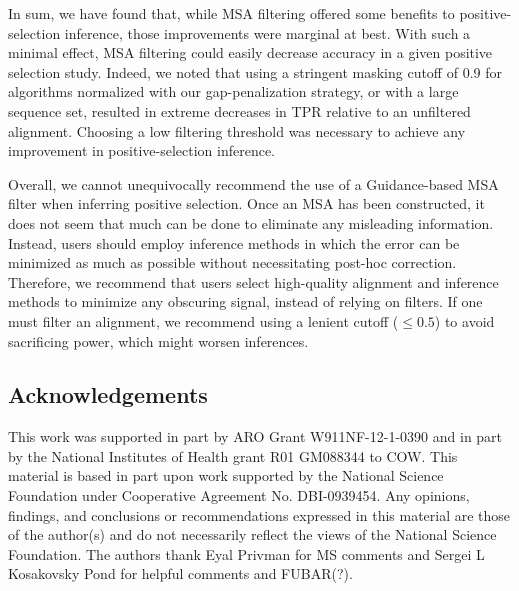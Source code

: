 \documentclass[11pt]{article}
\begin{document}
In sum, we have found that, while MSA filtering offered some benefits to positive-selection inference, those improvements were marginal at best. With such a minimal effect, MSA filtering could easily decrease accuracy in a given positive selection study. Indeed, we noted that using a stringent masking cutoff of 0.9 for algorithms normalized with our gap-penalization strategy, or with a large sequence set, resulted in extreme decreases in TPR relative to an unfiltered alignment. Choosing a low filtering threshold was necessary to achieve any improvement in positive-selection inference.  

Overall, we cannot unequivocally recommend the use of a Guidance-based MSA filter when inferring positive selection. Once an MSA has been constructed, it does not seem that much can be done to eliminate any misleading information. Instead, users should employ inference methods in which the error can be minimized as much as possible without necessitating post-hoc correction. Therefore, we recommend that users select high-quality alignment and inference methods to minimize any obscuring signal, instead of relying on filters. If one must filter an alignment, we recommend using a lenient cutoff ($\leq0.5$) to avoid sacrificing power, which might worsen inferences.



\subsection*{Acknowledgements}
This work was supported in part by ARO Grant W911NF-12-1-0390 and in part by the National Institutes of Health grant R01 GM088344 to COW. This material is based in part upon work supported by the National Science Foundation under Cooperative Agreement No. DBI-0939454. Any opinions, findings, and conclusions or recommendations expressed in this material are those of the author(s) and do not necessarily reflect the views of the National Science Foundation. The authors thank Eyal Privman for MS comments and Sergei L Kosakovsky Pond for helpful comments and FUBAR(?).



	

\newpage
\end{document}
